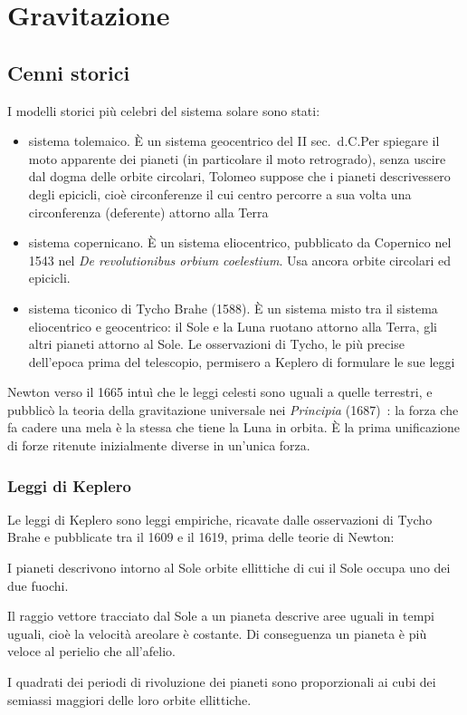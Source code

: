 
\chapter{Gravitazione}
\minitoc
\section{Cenni storici}
I modelli storici più celebri del sistema solare sono stati:
\begin{itemize}
  \item[--]sistema tolemaico. \`E un sistema geocentrico del II
  sec.\ d.C.\@ Per spiegare il moto apparente dei pianeti (in particolare il moto retrogrado), senza uscire dal dogma
  delle orbite circolari, Tolomeo suppose che i pianeti
  descrivessero degli epicicli, cioè circonferenze il cui centro percorre a sua volta una circonferenza (deferente) attorno alla Terra
  \item[--]sistema copernicano. \`E un sistema eliocentrico, pubblicato da Copernico nel 1543 nel \emph{De revolutionibus orbium coelestium}. Usa ancora orbite circolari ed epicicli.
  \item[--]sistema ticonico di Tycho Brahe (1588). \`E un sistema misto tra il sistema
  eliocentrico e geocentrico: il Sole e la Luna ruotano attorno alla Terra, gli altri pianeti attorno al Sole. Le osservazioni di Tycho, le più precise dell'epoca prima del telescopio, permisero a Keplero di formulare le sue leggi
\end{itemize}

Newton verso il 1665 intuì che le leggi celesti sono uguali a quelle terrestri, e pubblicò la teoria della gravitazione universale nei \emph{Principia} (1687)~\cite{newton1687}: la forza che fa cadere una mela è la stessa che tiene la Luna in orbita. \`E la prima unificazione di forze ritenute inizialmente diverse in un'unica forza.

\subsection{Leggi di Keplero}
Le leggi di Keplero sono leggi empiriche, ricavate dalle osservazioni di Tycho Brahe e pubblicate tra il 1609 e il 1619, prima delle
teorie di Newton:
\begin{legge}
  I pianeti descrivono intorno al Sole orbite ellittiche di cui il Sole occupa uno dei due fuochi. \end{legge}
\begin{legge}
  Il raggio vettore tracciato dal Sole a un pianeta descrive aree uguali in tempi uguali, cioè la velocità areolare è costante. Di conseguenza un pianeta è più veloce al perielio che all'afelio.
\end{legge}
\begin{legge}
  I quadrati dei periodi di rivoluzione dei pianeti sono proporzionali ai cubi dei semiassi maggiori delle loro orbite ellittiche.
\end{legge}


